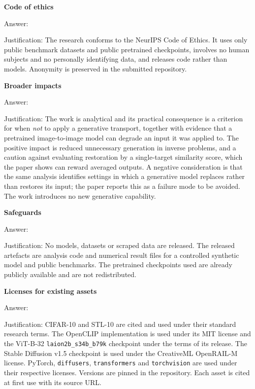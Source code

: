 \item {\bf Code of ethics}
    \item[] Answer: \answerYes{}
    \item[] Justification: The research conforms to the NeurIPS Code of Ethics. It uses only
    public benchmark datasets and public pretrained checkpoints, involves no human subjects and
    no personally identifying data, and releases code rather than models. Anonymity is preserved
    in the submitted repository.

\item {\bf Broader impacts}
    \item[] Answer: \answerYes{}
    \item[] Justification: The work is analytical and its practical consequence is a criterion
    for when \emph{not} to apply a generative transport, together with evidence that a pretrained
    image-to-image model can degrade an input it was applied to. The positive impact is reduced
    unnecessary generation in inverse problems, and a caution against evaluating restoration by a
    single-target similarity score, which the paper shows can reward averaged outputs. A negative
    consideration is that the same analysis identifies settings in which a generative model
    replaces rather than restores its input; the paper reports this as a failure mode to be
    avoided. The work introduces no new generative capability.

\item {\bf Safeguards}
    \item[] Answer: \answerNA{}
    \item[] Justification: No models, datasets or scraped data are released. The released
    artefacts are analysis code and numerical result files for a controlled synthetic model and
    public benchmarks. The pretrained checkpoints used are already publicly available and are not
    redistributed.

\item {\bf Licenses for existing assets}
    \item[] Answer: \answerYes{}
    \item[] Justification: CIFAR-10 and STL-10 are cited and used under their standard research
    terms. The OpenCLIP implementation is used under its MIT license and the ViT-B-32
    \texttt{laion2b\_s34b\_b79k} checkpoint under the terms of its release. The Stable Diffusion
    v1.5 checkpoint is used under the CreativeML OpenRAIL-M license. PyTorch, \texttt{diffusers},
    \texttt{transformers} and \texttt{torchvision} are used under their respective licenses.
    Versions are pinned in the repository. Each asset is cited at first use with its source URL.

